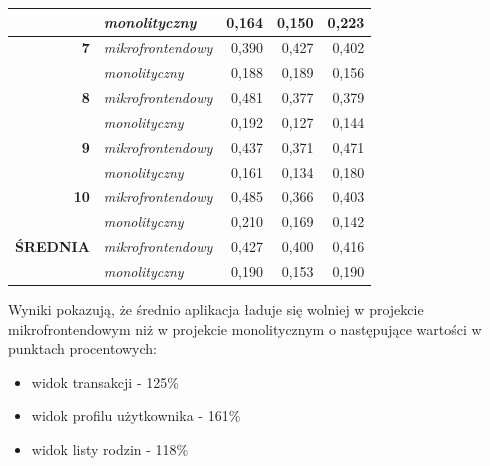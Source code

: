 \documentclass{SGGW-thesis}
\begin{document}
{\begin{table}[]
\begin{tabular}{ll|rrr|}
      \multicolumn{1}{|l|}{\textbf{}} & \textit{monolityczny} & \multicolumn{1}{r|}{0,164} & \multicolumn{1}{r|}{0,150} & 0,223 \\ \hline
      \multicolumn{1}{|r|}{\textbf{7}} & \textit{mikrofrontendowy} & \multicolumn{1}{r|}{0,390} & \multicolumn{1}{r|}{0,427} & 0,402 \\ \hline
      \multicolumn{1}{|l|}{\textbf{}} & \textit{monolityczny} & \multicolumn{1}{r|}{0,188} & \multicolumn{1}{r|}{0,189} & 0,156 \\ \hline
      \multicolumn{1}{|r|}{\textbf{8}} & \textit{mikrofrontendowy} & \multicolumn{1}{r|}{0,481} & \multicolumn{1}{r|}{0,377} & 0,379 \\ \hline
      \multicolumn{1}{|l|}{\textbf{}} & \textit{monolityczny} & \multicolumn{1}{r|}{0,192} & \multicolumn{1}{r|}{0,127} & 0,144 \\ \hline
      \multicolumn{1}{|r|}{\textbf{9}} & \textit{mikrofrontendowy} & \multicolumn{1}{r|}{0,437} & \multicolumn{1}{r|}{0,371} & 0,471 \\ \hline
      \multicolumn{1}{|l|}{\textbf{}} & \textit{monolityczny} & \multicolumn{1}{r|}{0,161} & \multicolumn{1}{r|}{0,134} & 0,180 \\ \hline
      \multicolumn{1}{|r|}{\textbf{10}} & \textit{mikrofrontendowy} & \multicolumn{1}{r|}{0,485} & \multicolumn{1}{r|}{0,366} & 0,403 \\ \hline
      \multicolumn{1}{|l|}{\textbf{}} & \textit{monolityczny} & \multicolumn{1}{r|}{0,210} & \multicolumn{1}{r|}{0,169} & 0,142 \\ \hline\hline
      \multicolumn{1}{|l|}{\textbf{ŚREDNIA}} & \textit{mikrofrontendowy} & \multicolumn{1}{r|}{0,427} & \multicolumn{1}{r|}{0,400} & 0,416 \\ \hline
      \multicolumn{1}{l|}{} & \textit{monolityczny} & \multicolumn{1}{r|}{0,190} & \multicolumn{1}{r|}{0,153} & 0,190 \\ \cline{2-5} 
      \end{tabular}
      \label{table:runtimes_with_cache}
    \end{table}

    Wyniki pokazują, że średnio aplikacja ładuje się wolniej w projekcie mikrofrontendowym niż w projekcie monolitycznym o następujące wartości w punktach procentowych:

    \begin{itemize}
      \item widok transakcji - 125\%
      \item widok profilu użytkownika - 161\%
      \item widok listy rodzin - 118\%
    \end{itemize}

}
\end{document}
